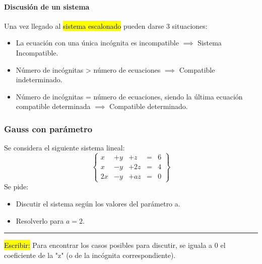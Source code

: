 \paragraph{Discusión de un sistema}

Una vez llegado al \hl{sistema escalonado} pueden darse 3 situaciones:

\begin{itemize}
	\item La ecuación con una única incógnita es incompatible $\implies$ Sistema Incompatible.
	\item Número de incógnitas > número de ecuaciones $\implies$ Compatible indeterminado.
	\item Número de incógnitas = número de ecuaciones, siendo la última ecuación compatible determinada $\implies$ Compatible determinado.
\end{itemize}

\subsubsection{Gauss con parámetro}

Se considera el siguiente sistema lineal:
\[
\left\{\begin{array}{ccccc}
x&+y&+z&=&6\\
x&-y&+2z&=&4\\
2x&-y&+az&=&0
\end{array}\right\}
\]
Se pide:
\begin{itemize}
	\item Discutir el sistema según los valores del parámetro a.
	\item Resolverlo para $a=2$.
\end{itemize}


\hrule

\hl{Escribir:} Para encontrar los casos posibles para discutir, se iguala a 0 el coeficiente de la "z" (o de la incógnita correspondiente).

